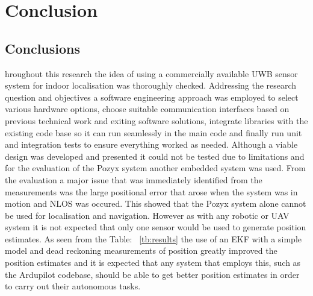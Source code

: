 \chapter{Conclusion}\label{ch:conclusion}
\section{Conclusions}\label{sec:conclusions}
hroughout this research the idea of using a commercially available UWB sensor system for indoor localisation was thoroughly checked.
Addressing the research question and objectives a software engineering approach was employed to select various hardware options, choose suitable communication interfaces based on previous technical work and exiting software solutions,
integrate libraries with the existing code base so it can run seamlessly in the main code and finally run unit and integration tests to ensure everything worked as needed.
Although a viable design was developed and presented it could not be tested due to limitations and for the evaluation of the Pozyx system another embedded system was used.
From the evaluation a major issue that was immediately identified from the measurements was the large positional error that arose when the system was in motion and NLOS was occured.
This showed that the Pozyx system alone cannot be used for localisation and navigation.
However as with any robotic or UAV system it is not expected that only one sensor would be used to generate position estimates.
As seen from the Table: ~\ref{tb:results} the use of an EKF with a simple model and dead reckoning measurements of position greatly improved the position estimates and it is expected that any system that employs this, such as the Ardupilot codebase, should be able to get better position estimates in order to carry out
their autonomous tasks.

